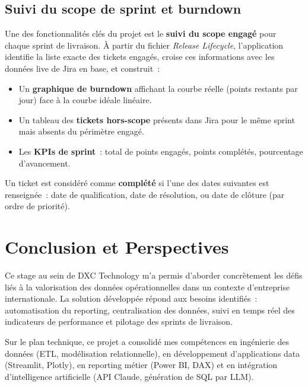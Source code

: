 \documentclass[12pt, a4paper]{report}
\begin{document}
\section{Suivi du scope de sprint et burndown}

Une des fonctionnalités clés du projet est le \textbf{suivi du scope engagé} pour chaque sprint de livraison. À partir du fichier \textit{Release Lifecycle}, l'application identifie la liste exacte des tickets engagés, croise ces informations avec les données live de Jira en base, et construit~:

\begin{itemize}[leftmargin=2em]
    \item Un \textbf{graphique de burndown} affichant la courbe réelle (points restants par jour) face à la courbe idéale linéaire.
    \item Un tableau des \textbf{tickets hors-scope} présents dans Jira pour le même sprint mais absents du périmètre engagé.
    \item Les \textbf{KPIs de sprint}~: total de points engagés, points complétés, pourcentage d'avancement.
\end{itemize}

Un ticket est considéré comme \textbf{complété} si l'une des dates suivantes est renseignée~: date de qualification, date de résolution, ou date de clôture (par ordre de priorité).

\chapter*{Conclusion et Perspectives}

Ce stage au sein de DXC Technology m'a permis d'aborder concrètement les défis liés à la valorisation des données opérationnelles dans un contexte d'entreprise internationale. La solution développée répond aux besoins identifiés~: automatisation du reporting, centralisation des données, suivi en temps réel des indicateurs de performance et pilotage des sprints de livraison.

Sur le plan technique, ce projet a consolidé mes compétences en ingénierie des données (ETL, modélisation relationnelle), en développement d'applications data (Streamlit, Plotly), en reporting métier (Power BI, DAX) et en intégration d'intelligence artificielle (API Claude, génération de SQL par LLM).
\end{document}
